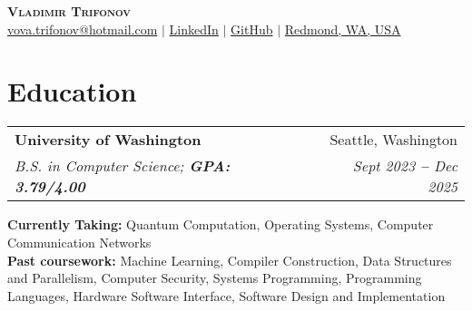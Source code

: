 \documentclass[letterpaper,11pt]{article}
\makeatletter
\newcommand{\resumeEducationHeading}[4]{
  \vspace{-2pt}\item
    \begin{tabular*}{0.97\textwidth}[t]{l@{\extracolsep{\fill}}r}
      \textbf{#1} & #2 \\
      \textit{\small#3} & \textit{\small #4} \\
    \end{tabular*}\vspace{-5pt}
}
\newcommand{\resumeSubHeadingListStart}{\begin{itemize}[leftmargin=0.15in, label={}]}
\newcommand{\resumeSubHeadingListEnd}{\end{itemize}}
\makeatother
\begin{document}

\begin{center}
    \textbf{\Huge \scshape Vladimir Trifonov} \\ \vspace{3pt}
    \small
    \faEnvelope \hspace{.5pt} \href{mailto:vova.trifonov@hotmail.com}{\color{blue}vova.trifonov@hotmail.com}
    $|$
    \faLinkedinSquare \hspace{.5pt} \href{https://www.linkedin.com/in/vladimir-trifonov-a06284220/}{\color{blue}LinkedIn}
    $|$
    \faGithub \hspace{.5pt} \href{https://github.com/Vladimirtrif}{\color{blue}GitHub}
    $|$
    \faMapMarker \hspace{.5pt} \href{https://maps.app.goo.gl/JGq95Uiw7m12e89E8}{\color{blue}Redmond, WA, USA}
\end{center}




\section{Education}
  \vspace{3pt}
  \resumeSubHeadingListStart
    
    \resumeEducationHeading
      {University of Washington} {Seattle, Washington}
      {B.S. in Computer Science;   \textbf{GPA: 3.79/4.00}} {Sept 2023 \textbf{--} Dec 2025}
        \resumeSubHeadingListStart
        \small{\item{
            \textbf{Currently Taking:} Quantum Computation, Operating Systems, Computer Communication Networks \\
             \textbf{Past coursework:} Machine Learning, Compiler Construction, Data Structures and Parallelism, Computer Security,
              Systems Programming, Programming Languages, Hardware Software Interface, Software Design and Implementation}}
        \resumeSubHeadingListEnd
  \resumeSubHeadingListEnd



\end{document}
